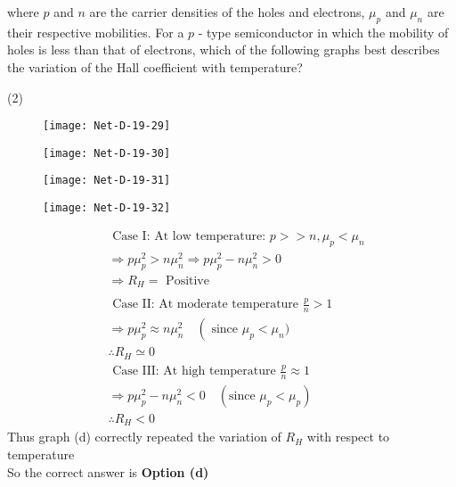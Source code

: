 \begin{enumerate}
$$$$
where $p$ and $n$ are the carrier densities of the holes and electrons, $\mu_{p}$ and $\mu_{n}$ are their respective mobilities. For a $p$ - type semiconductor in which the mobility of holes is less than that of electrons, which of the following graphs best describes the variation of the Hall coefficient with temperature?	
\begin{answer}
	 \begin{tasks}(2)
		\task[\textbf{a.}]
		\begin{figure}[H]
			\centering
			\texttt{[image: Net-D-19-29]}
		\end{figure}
		\task[\textbf{b.}]
			\begin{figure}[H]
			\centering
			\texttt{[image: Net-D-19-30]}
		\end{figure}
		\task[\textbf{c.}]
			\begin{figure}[H]
			\centering
			\texttt{[image: Net-D-19-31]}
		\end{figure}
		\task[\textbf{d.}] 
			\begin{figure}[H]
			\centering
			\texttt{[image: Net-D-19-32]}
		\end{figure}
	\end{tasks}
	\begin{align*}
	&\text { Case I: At low temperature: } p>>n, \mu_{p}<\mu_{n}\\
	&\Rightarrow p \mu_{p}^{2}>n \mu_{n}^{2} \Rightarrow p \mu_{p}^{2}-n \mu_{n}^{2}>0 \\
	&\Rightarrow R_{H}=\text { Positive }\\\\
	&\text { Case II: At moderate temperature } \frac{p}{n}>1\\
	&\Rightarrow p \mu_{p}^{2} \approx n \mu_{n}^{2} \quad\left(\right.\text{ since }\mu_{p}<\mu_{n} )\\
	&\therefore R_{H} \simeq 0\\
	&\text { Case III: At high temperature } \frac{p}{n} \approx 1\\
	&\Rightarrow p \mu_{p}^{2}-n \mu_{n}^{2}<0 \quad\left(\right. \text{since }\left.\mu_{p}<\mu_{p}\right)\\
	&\therefore R_{H}<0
	\end{align*}
	Thus graph
	(d) correctly repeated the variation of $R_{H}$ with respect to temperature\\
	So the correct answer is \textbf{Option (d)}
\end{answer}

\end{enumerate}
